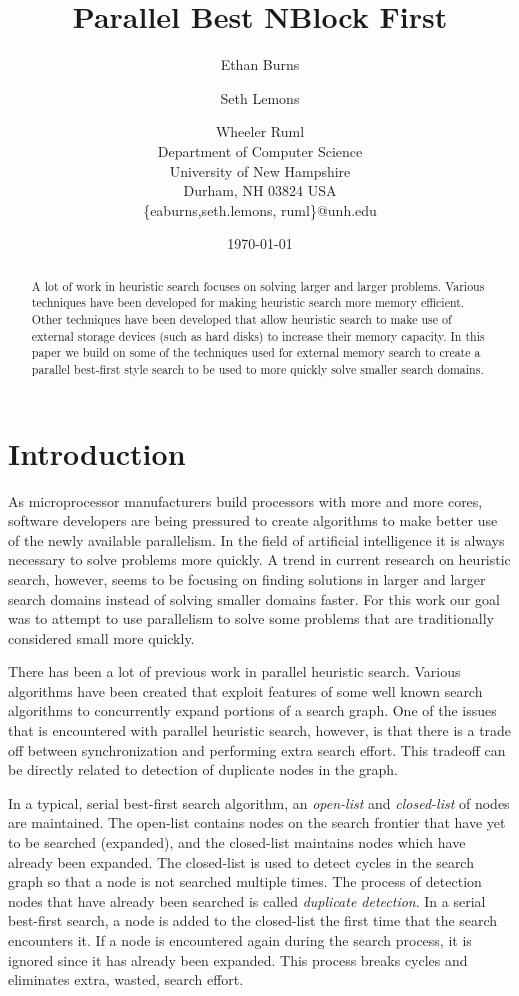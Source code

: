 \documentclass{article}
\title{Parallel Best NBlock First}
\author{Ethan Burns \and Seth Lemons \and Wheeler Ruml \\
Department of Computer Science \\
University of New Hampshire \\
Durham, NH 03824 USA \\
\{eaburns,seth.lemons, ruml\}@unh.edu}
\date{\today}
\begin{document}
\maketitle

\begin{abstract}
A lot of work in heuristic search focuses on solving larger and larger
problems.  Various techniques have been developed for making heuristic
search more memory efficient.  Other techniques have been developed
that allow heuristic search to make use of external storage devices
(such as hard disks) to increase their memory capacity.  In this paper
we build on some of the techniques used for external memory search to
create a parallel best-first style search to be used to more quickly
solve smaller search domains.
\end{abstract}

\section{Introduction}

As microprocessor manufacturers build processors with more and more
cores, software developers are being pressured to create algorithms to
make better use of the newly available parallelism.  In the field of
artificial intelligence it is always necessary to solve problems more
quickly.  A trend in current research on heuristic search, however,
seems to be focusing on finding solutions in larger and larger search
domains instead of solving smaller domains faster.  For this work our
goal was to attempt to use parallelism to solve some problems that are
traditionally considered small more quickly.

There has been a lot of previous work in parallel heuristic search.
Various algorithms have been created that exploit features of some
well known search algorithms to concurrently expand portions of a
search graph.  One of the issues that is encountered with parallel
heuristic search, however, is that there is a trade off between
synchronization and performing extra search effort.  This tradeoff can
be directly related to detection of duplicate nodes in the graph.

In a typical, serial best-first search algorithm, an \emph{open-list}
and \emph{closed-list} of nodes are maintained.  The open-list
contains nodes on the search frontier that have yet to be searched
(expanded), and the closed-list maintains nodes which have already
been expanded.  The closed-list is used to detect cycles in the search
graph so that a node is not searched multiple times.  The process of
detection nodes that have already been searched is called
\emph{duplicate detection}.  In a serial best-first search, a node is
added to the closed-list the first time that the search encounters it.
If a node is encountered again during the search process, it is
ignored since it has already been expanded.  This process breaks
cycles and eliminates extra, wasted, search effort.
\end{document}
